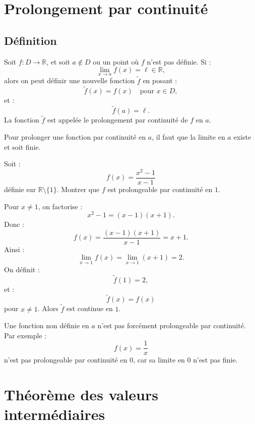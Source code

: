 \documentclass[11pt,a4paper]{article}
\newcommand{\R}{\mathbb R}
\begin{document}
\section{Prolongement par continuité}

\subsection{Définition}

\begin{definitionbox}
Soit \(f:D\to\R\), et soit \(a\notin D\) ou un point où \(f\) n'est pas définie.  
Si :
\[
\lim_{x\to a}f(x)=\ell\in\R,
\]
alors on peut définir une nouvelle fonction \(\widetilde f\) en posant :
\[
\widetilde f(x)=f(x)\quad\text{pour }x\in D,
\]
et :
\[
\widetilde f(a)=\ell.
\]
La fonction \(\widetilde f\) est appelée le prolongement par continuité de \(f\) en \(a\).
\end{definitionbox}

\begin{retenirbox}
Pour prolonger une fonction par continuité en \(a\), il faut que la limite en \(a\) existe et soit finie.
\end{retenirbox}

\begin{exercicebox}
Soit :
\[
f(x)=\frac{x^2-1}{x-1}
\]
définie sur \(\R\setminus\{1\}\).  
Montrer que \(f\) est prolongeable par continuité en \(1\).
\end{exercicebox}

\begin{correctionbox}
Pour \(x\neq1\), on factorise :
\[
x^2-1=(x-1)(x+1).
\]
Donc :
\[
f(x)=\frac{(x-1)(x+1)}{x-1}=x+1.
\]
Ainsi :
\[
\lim_{x\to1}f(x)=\lim_{x\to1}(x+1)=2.
\]
On définit :
\[
\widetilde f(1)=2,
\]
et :
\[
\widetilde f(x)=f(x)
\]
pour \(x\neq1\).  
Alors \(\widetilde f\) est continue en \(1\).
\end{correctionbox}

\begin{erreurbox}
Une fonction non définie en \(a\) n'est pas forcément prolongeable par continuité.  
Par exemple :
\[
f(x)=\frac1x
\]
n'est pas prolongeable par continuité en \(0\), car sa limite en \(0\) n'est pas finie.
\end{erreurbox}

\section{Théorème des valeurs intermédiaires}
\end{document}
